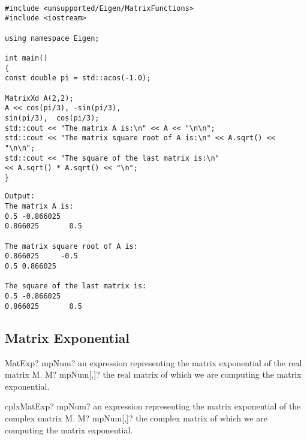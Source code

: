\begin{lstlisting}

#include <unsupported/Eigen/MatrixFunctions>
#include <iostream>

using namespace Eigen;

int main()
{
const double pi = std::acos(-1.0);

MatrixXd A(2,2);
A << cos(pi/3), -sin(pi/3),
sin(pi/3),  cos(pi/3);
std::cout << "The matrix A is:\n" << A << "\n\n";
std::cout << "The matrix square root of A is:\n" << A.sqrt() << "\n\n";
std::cout << "The square of the last matrix is:\n" 
<< A.sqrt() * A.sqrt() << "\n";
}
\end{lstlisting}

\begin{verbatim}
Output:
The matrix A is:
0.5 -0.866025
0.866025       0.5

The matrix square root of A is:
0.866025     -0.5
0.5 0.866025

The square of the last matrix is:
0.5 -0.866025
0.866025       0.5

\end{verbatim} 


\newpage
\subsection{Matrix Exponential}


\begin{mpFunctionsExtract}
	\mpFunctionOne
	{MatExp? mpNum? an expression representing the matrix exponential of the real matrix M.}
	{M? mpNum[,]? the real matrix of which we are computing the matrix exponential.}
\end{mpFunctionsExtract}

\vspace{0.6cm}
\begin{mpFunctionsExtract}
	\mpFunctionOne
	{cplxMatExp? mpNum? an expression representing the matrix exponential of the complex matrix M.}
	{M? mpNum[,]? the complex matrix of which we are computing the matrix exponential.}
\end{mpFunctionsExtract}

%

